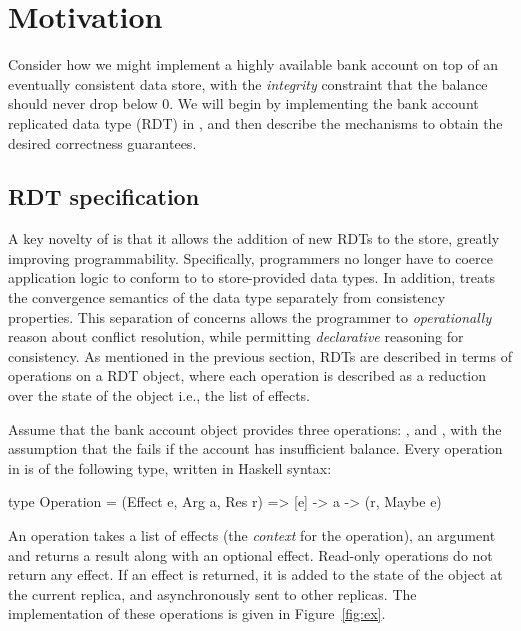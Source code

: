 \section{Motivation}
\label{sec:motivation}

Consider how we might implement a highly available bank account on top of an
eventually consistent data store, with the \emph{integrity} constraint that the
balance should never drop below 0. We will begin by implementing the bank
account replicated data type (RDT) in \name, and then describe the mechanisms
to obtain the desired correctness guarantees.

\subsection{RDT specification}

A key novelty of \name is that it allows the addition of new RDTs to the
store, greatly improving programmability.  Specifically, programmers no
longer have to coerce application logic to conform to to store-provided data
types. In addition, \name treats the convergence semantics of the data type
separately from consistency properties. This separation of concerns allows
the programmer to \emph{operationally} reason about conflict resolution,
while permitting \emph{declarative} reasoning for consistency. As mentioned
in the previous section, RDTs are described in terms of operations on a RDT
object, where each operation is described as a reduction over the state of
the object i.e., the list of effects.

Assume that the bank account object provides three operations: ,
 and , with the assumption that the 
fails if the account has insufficient balance.  Every operation in \name is
of the following type, written in Haskell syntax:

\begin{codehaskell}
type Operation = (Effect e, Arg a, Res r)
               => [e] -> a -> (r, Maybe e)
\end{codehaskell}

\noindent An operation takes a list of effects (the \emph{context} for the operation), an
argument and returns a result along with an optional effect. Read-only
operations do not return any effect. If an effect is returned, it is added to
the state of the object at the current replica, and asynchronously sent to
other replicas. The implementation of these operations is
given in Figure~\ref{fig:ex}.

